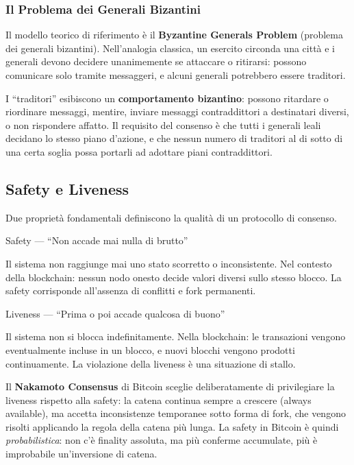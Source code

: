 \documentclass[
  italian,
  openany]{book}
\begin{document}
\subsubsection{Il Problema dei Generali
Bizantini}\label{il-problema-dei-generali-bizantini}

Il modello teorico di riferimento è il \textbf{Byzantine Generals
Problem} (problema dei generali bizantini). Nell'analogia classica, un
esercito circonda una città e i generali devono decidere unanimemente se
attaccare o ritirarsi: possono comunicare solo tramite messaggeri, e
alcuni generali potrebbero essere traditori.

I ``traditori'' esibiscono un \textbf{comportamento bizantino}: possono
ritardare o riordinare messaggi, mentire, inviare messaggi
contraddittori a destinatari diversi, o non rispondere affatto. Il
requisito del consenso è che tutti i generali leali decidano lo stesso
piano d'azione, e che nessun numero di traditori al di sotto di una
certa soglia possa portarli ad adottare piani contraddittori.

\subsection{Safety e Liveness}\label{safety-e-liveness}

Due proprietà fondamentali definiscono la qualità di un protocollo di
consenso.

\begin{calloutdefinition}{Safety — “Non accade mai nulla di brutto”}

Il sistema non raggiunge mai uno stato scorretto o inconsistente. Nel
contesto della blockchain: nessun nodo onesto decide valori diversi
sullo stesso blocco. La safety corrisponde all'assenza di conflitti e
fork permanenti.

\end{calloutdefinition}

\begin{calloutdefinition}{Liveness — “Prima o poi accade qualcosa di buono”}

Il sistema non si blocca indefinitamente. Nella blockchain: le
transazioni vengono eventualmente incluse in un blocco, e nuovi blocchi
vengono prodotti continuamente. La violazione della liveness è una
situazione di stallo.

\end{calloutdefinition}

Il \textbf{Nakamoto Consensus} di Bitcoin sceglie deliberatamente di
privilegiare la liveness rispetto alla safety: la catena continua sempre
a crescere (always available), ma accetta inconsistenze temporanee sotto
forma di fork, che vengono risolti applicando la regola della catena più
lunga. La safety in Bitcoin è quindi \emph{probabilistica}: non c'è
finality assoluta, ma più conferme accumulate, più è improbabile
un'inversione di catena.
\end{document}
